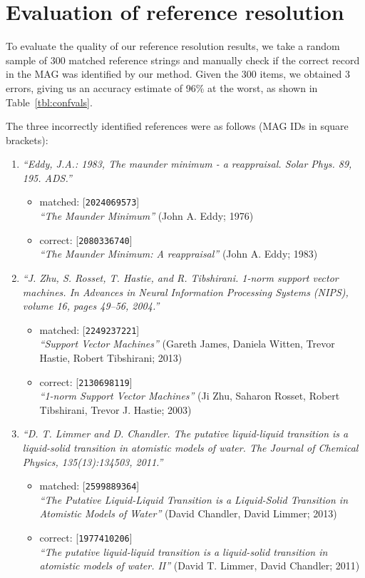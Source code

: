\section{Evaluation of reference resolution}
To evaluate the quality of our reference resolution results, we take a random sample of 300 matched reference strings and manually check if the correct record in the MAG was identified by our method. Given the 300 items, we obtained 3 errors, giving us an accuracy estimate of 96\% at the worst, as shown in Table~\ref{tbl:confvals}.

The three incorrectly identified references were as follows (MAG IDs in square brackets):
\begin{enumerate}
    \item \emph{``Eddy, J.A.: 1983, The maunder minimum - a reappraisal. Solar Phys. 89, 195. ADS.''}
    \begin{itemize}
        \item matched: [\texttt{2024069573}]\\\emph{``The Maunder Minimum''} (John A. Eddy; 1976)
        \item correct: [\texttt{2080336740}]\\\emph{``The Maunder Minimum: A reappraisal''} (John A. Eddy; 1983)
    \end{itemize}
    \item \emph{``J. Zhu, S. Rosset, T. Hastie, and R. Tibshirani. 1-norm support vector machines. In Advances in Neural Information Processing Systems (NIPS), volume 16, pages 49–56, 2004.''}
    \begin{itemize}
        \item matched: [\texttt{2249237221}]\\\emph{``Support Vector Machines''} (Gareth James, Daniela Witten, Trevor Hastie, Robert Tibshirani; 2013)
        \item correct: [\texttt{2130698119}]\\\emph{``1-norm Support Vector Machines''} (Ji Zhu, Saharon Rosset, Robert Tibshirani, Trevor J. Hastie; 2003)
    \end{itemize}
    \item \emph{``D. T. Limmer and D. Chandler. The putative liquid-liquid transition is a liquid-solid transition in atomistic models of water. The Journal of Chemical Physics, 135(13):134503, 2011.''}
    \begin{itemize}
        \item matched: [\texttt{2599889364}]\\\emph{``The Putative Liquid-Liquid Transition is a Liquid-Solid Transition in Atomistic Models of Water''} (David Chandler, David Limmer; 2013)
        \item correct: [\texttt{1977410206}]\\\emph{``The putative liquid-liquid transition is a liquid-solid transition in atomistic models of water. II''} (David T. Limmer, David Chandler; 2011)
    \end{itemize}
\end{enumerate}

